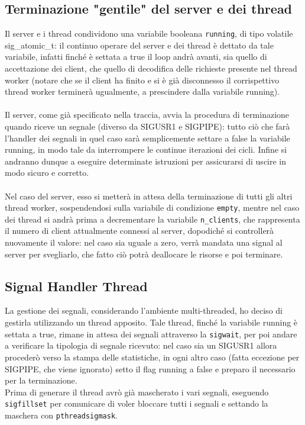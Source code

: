 \newpage

\subsection{Terminazione "gentile" del server e dei thread}
\begin{flushleft}


Il server e i thread condividono una variabile booleana \texttt{running}, di tipo volatile sig\_atomic\_t: il continuo operare del server e dei thread è dettato da tale variabile, infatti finché è settata a true il loop andrà avanti, sia quello di accettazione dei client, che quello di decodifica delle richieste presente nel thread worker (notare che se il client ha finito e si è già disconnesso il corrispettivo thread worker terminerà ugualmente, a prescindere dalla variabile running).
\\~\\
Il server, come già specificato nella traccia, avvia la procedura di terminazione quando riceve un segnale (diverso da SIGUSR1 e SIGPIPE): tutto ciò che farà l'handler dei segnali in quel caso sarà semplicemente settare a false la variabile running, in modo tale da interrompere le continue iterazioni dei cicli. Infine si andranno dunque a eseguire determinate istruzioni per assicurarsi di uscire in modo sicuro e corretto.
\\~\\
Nel caso del server, esso si metterà in attesa della terminazione di tutti gli altri thread worker, sospendendosi sulla variabile di condizione \texttt{empty}, mentre nel caso dei thread si andrà prima a decrementare la variabile \texttt{n\_clients}, che rappresenta il numero di client attualmente connessi al server, dopodiché si controllerà nuovamente il valore: nel caso sia uguale a zero, verrà mandata una signal al server per svegliarlo, che fatto ciò potrà deallocare le risorse e poi terminare.

\end{flushleft}

\subsection{Signal Handler Thread}
\begin{flushleft}

La gestione dei segnali, considerando l'ambiente multi-threaded, ho deciso di gestirla utilizzando un thread apposito. Tale thread, finché la variabile running è settata a true, rimane in attesa dei segnali attraverso la \texttt{sigwait}, per poi andare a verificare la tipologia di segnale ricevuto: nel caso sia un SIGUSR1 allora procederò verso la stampa delle statistiche, in ogni altro caso (fatta eccezione per SIGPIPE, che viene ignorato) setto il flag running a false e preparo il necessario per la terminazione. 
\\
Prima di generare il thread avrò già mascherato i vari segnali, eseguendo \texttt{sigfillset} per comunicare di voler bloccare tutti i segnali e settando la maschera con \texttt{pthread\textunderscore sigmask}.

\end{flushleft}

